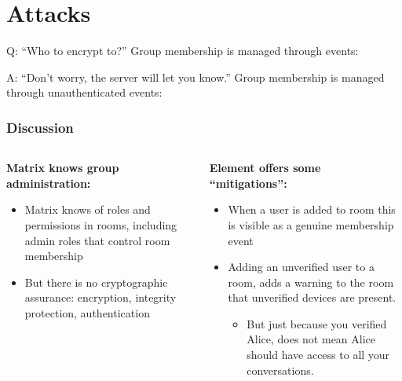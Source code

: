 \documentclass[aspectratio=169]{beamer}
\begin{document}
\section{Attacks}

\begin{frame}{Q: ``Who to encrypt to?''}
  Group membership is managed through events:

  \centering
  \scalebox{0.75}{}

\end{frame}

\begin{frame}{A: ``Don't worry, the server will let you know.''}
  Group membership is managed through \alert{unauthenticated} events:

  \centering\scalebox{0.75}{}

\end{frame}

\begin{frame}
\frametitle{Discussion}

\begin{columns}[t]
  \begin{column}{0.5\columnwidth}
    \textbf{Matrix knows group administration:}
    \begin{itemize}
    \item Matrix knows of roles and permissions in rooms, including admin roles that control room membership
    \item But there is no cryptographic assurance: encryption, integrity protection, authentication
    \end{itemize}
  \end{column}
  \begin{column}{0.5\columnwidth}
    \textbf{Element offers some ``mitigations'':}
    \begin{itemize}
    \item When a user is added to room this is visible as a genuine membership event
    \item Adding an unverified user to a room, adds a warning to the room that unverified devices are present.
      \begin{itemize}
      \item But just because you verified Alice, does not mean Alice should have access to all your conversations.
      \end{itemize}
    \end{itemize}
  \end{column}
\end{columns}

\end{frame}
\end{document}
